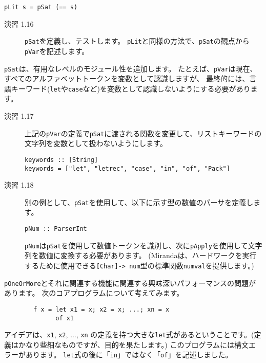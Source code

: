 \documentclass{jarticle}
\begin{document}
\begin{verbatim}
pLit s = pSat (== s)
\end{verbatim}

\begin{description}
	\item[演習 1.16] \texttt{pSat}を定義し、テストします。
	      \texttt{pLit}と同様の方法で、\texttt{pSat}の観点から\texttt{pVar}を記述します。
\end{description}

\texttt{pSat}は、有用なレベルのモジュール性を追加します。
たとえば、\texttt{pVar}は現在、すべてのアルファベットトークンを変数として認識しますが、
最終的には、言語キーワード(\texttt{let}や\texttt{case}など)を変数として認識しないようにする必要があります。

\begin{description}
	\item[演習 1.17] 上記の\texttt{pVar}の定義で\texttt{pSat}に渡される関数を変更して、リストキーワードの文字列を変数として扱わないようにします。

	      \begin{verbatim}
keywords :: [String]
keywords = ["let", "letrec", "case", "in", "of", "Pack"]
\end{verbatim}

	\item[演習 1.18] 別の例として、\texttt{pSat}を使用して、以下に示す型の数値のパーサを定義します。

	      \begin{verbatim}
pNum :: ParserInt
\end{verbatim}

	      \texttt{pNum}は\texttt{pSat}を使用して数値トークンを識別し、次に\texttt{pApply}を使用して文字列を数値に変換する必要があります。
	      (Mirandaは、ハードワークを実行するために使用できる\texttt{[Char]-> num}型の標準関数\texttt{numval}を提供します。)
\end{description}

\texttt{pOneOrMore}とそれに関連する機能に関連する興味深いパフォーマンスの問題があります。
次のコアプログラムについて考えてみます。

\begin{verbatim}
        f x = let x1 = x; x2 = x; ...; xn = x
              of x1
\end{verbatim}

アイデアは、\texttt{x1}, \texttt{x2}, $\ldots$, \texttt{xn} の定義を持つ大きな\texttt{let}式があるということです。(定義はかなり些細なものですが、目的を果たします。)
このプログラムには構文エラーがあります。
\texttt{let}式の後に「\texttt{in}」ではなく「\texttt{of}」を記述しました。
\end{document}
